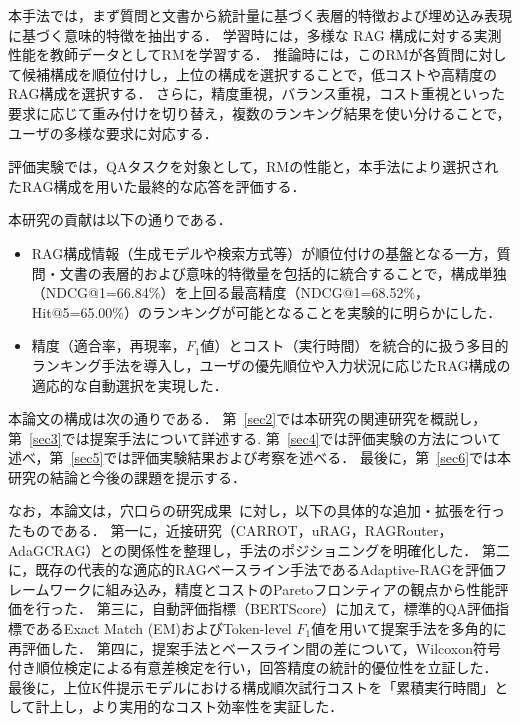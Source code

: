 本手法では，まず質問と文書から統計量に基づく表層的特徴および埋め込み表現に基づく意味的特徴を抽出する．
学習時には，多様な RAG 構成に対する実測性能を教師データとしてRMを学習する．
推論時には，このRMが各質問に対して候補構成を順位付けし，上位の構成を選択することで，低コストや高精度のRAG構成を選択する．
さらに，精度重視，バランス重視，コスト重視といった要求に応じて重み付けを切り替え，複数のランキング結果を使い分けることで，ユーザの多様な要求に対応する．

評価実験では，QAタスクを対象として，RMの性能と，本手法により選択されたRAG構成を用いた最終的な応答を評価する．

本研究の貢献は以下の通りである．
\begin{itemize}
\item RAG構成情報（生成モデルや検索方式等）が順位付けの基盤となる一方，質問・文書の表層的および意味的特徴量を包括的に統合することで，構成単独（NDCG@1=66.84\%）を上回る最高精度（NDCG@1=68.52\%，Hit@5=65.00\%）のランキングが可能となることを実験的に明らかにした．
\item 精度（適合率，再現率，$F_1$値）とコスト（実行時間）を統合的に扱う多目的ランキング手法を導入し，ユーザの優先順位や入力状況に応じたRAG構成の適応的な自動選択を実現した．
\end{itemize}

本論文の構成は次の通りである．
第~\ref{sec2}では本研究の関連研究を概説し，第~\ref{sec3}では提案手法について詳述する.
第~\ref{sec4}では評価実験の方法について述べ，第~\ref{sec5}では評価実験結果および考察を述べる．
最後に，第~\ref{sec6}では本研究の結論と今後の課題を提示する．

なお，本論文は，穴口らの研究成果~\cite{anaguchi26}に対し，以下の具体的な追加・拡張を行ったものである．
第一に，近接研究（CARROT，uRAG，RAGRouter，AdaGCRAG）との関係性を整理し，手法のポジショニングを明確化した．
第二に，既存の代表的な適応的RAGベースライン手法であるAdaptive-RAGを評価フレームワークに組み込み，精度とコストのParetoフロンティアの観点から性能評価を行った．
第三に，自動評価指標（BERTScore）に加えて，標準的QA評価指標であるExact Match (EM)およびToken-level $F_1$値を用いて提案手法を多角的に再評価した．
第四に，提案手法とベースライン間の差について，Wilcoxon符号付き順位検定による有意差検定を行い，回答精度の統計的優位性を立証した．
最後に，上位K件提示モデルにおける構成順次試行コストを「累積実行時間」として計上し，より実用的なコスト効率性を実証した．